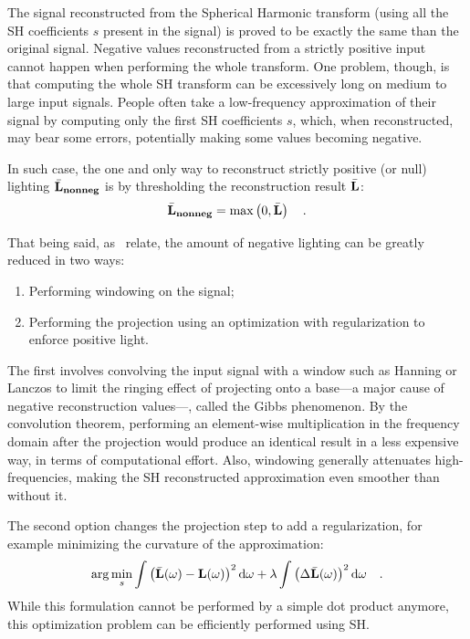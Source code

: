 \documentclass{report}
\begin{document}
The signal reconstructed from the Spherical Harmonic transform (using all the SH coefficients $s$ present in the signal) is proved to be exactly the same than the original signal. Negative values reconstructed from a strictly positive input cannot happen when performing the whole transform. One problem, though, is that computing the whole SH transform can be excessively long on medium to large input signals. People often take a low-frequency approximation of their signal by computing only the first SH coefficients $s$, which, when reconstructed, may bear some errors, potentially making some values becoming negative.

In such case, the one and only way to reconstruct strictly positive (or null) lighting $\bar{\mathbf{L}}_{\mathbf{nonneg}}$ is by thresholding the reconstruction result $\bar{\mathbf{L}}$:
\begin{equation}
\bar{\mathbf{L}}_{\mathbf{nonneg}} = \max\left( 0, \bar{\mathbf{L}} \right) \quad.
\end{equation}

That being said, as~\cite{Sloan2008} relate, the amount of negative lighting can be greatly reduced in two ways:
\begin{enumerate}
  \item{Performing windowing on the signal;}
  \item{Performing the projection using an optimization with regularization to enforce positive light.}
\end{enumerate}
The first involves convolving the input signal with a window such as Hanning or Lanczos to limit the ringing effect of projecting onto a base---a major cause of negative reconstruction values---, called the Gibbs phenomenon. By the convolution theorem, performing an element-wise multiplication in the frequency domain after the projection would produce an identical result in a less expensive way, in terms of computational effort. Also, windowing generally attenuates high-frequencies, making the SH reconstructed approximation even smoother than without it.

The second option changes the projection step to add a regularization, for example minimizing the curvature of the approximation:
\begin{equation}
\arg \min_s \int\left( \bar{\mathbf{L}}(\omega) - \mathbf{L}(\omega)\right)^2 \mathrm{d}\omega + \lambda \int \left(\Delta \bar{\mathbf{L}}(\omega)\right)^2 \mathrm{d}\omega
\quad.
\end{equation}
While this formulation cannot be performed by a simple dot product anymore, this optimization problem can be efficiently performed using SH.
\end{document}
